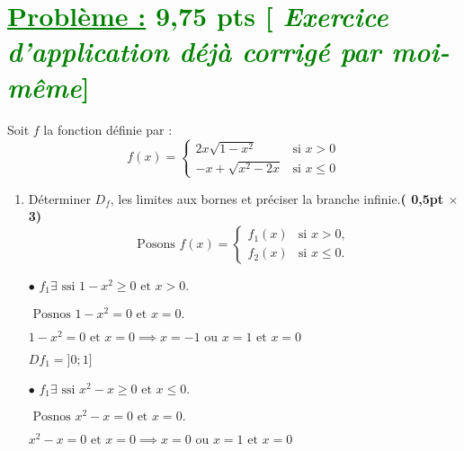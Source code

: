 \documentclass[12pt,a4paper]{article}
\begin{document}
\section*{\textcolor{green}{\underline{Problème :} 9,75 pts [\textit{ Exercice d'application déjà corrigé par moi-même}]}}
Soit $f$ la fonction définie par :
\[
f(x) =
\begin{cases} 
2x\sqrt{1 - x^2} & \text{si } x > 0 \\ 
-x + \sqrt{x^2 - 2x} & \text{si } x \leq 0 
\end{cases}
\]
\begin{enumerate}
\item Déterminer $D_f$, les limites aux bornes et préciser la branche infinie.\hfill \textbf{( 0,5pt $\times$ 3)}
\[\text{Posons }
f(x) =
\begin{cases} 
f_1(x) & \text{si } x > 0, \\ 
f_2(x) & \text{si } x \leq 0.
\end{cases}
\]

\( \bullet \) \(f_1 \exists \text{ ssi } 1 - x^2 \geq 0 \text{ et } x > 0. \)

\(\text{ Posnos } 1 - x^2 = 0 \text{ et } x = 0. \)

\( 1 - x^2 = 0 \text{ et } x = 0 \implies x = -1 \text{ ou } x = 1 \text{ et } x = 0 \)

    
    \underline{\( Df_1 = ]0;1] \)}
    
\( \bullet \) \(f_1 \exists \text{ ssi } x^2 - x \geq 0 \text{ et } x \leq 0. \) 

\(\text{ Posnos } x^2 - x = 0 \text{ et } x = 0. \)

\( x^2 - x = 0 \text{ et } x = 0 \implies x = 0 \text{ ou } x = 1 \text{ et } x = 0 \)  

    

\end{enumerate}
\end{document}
